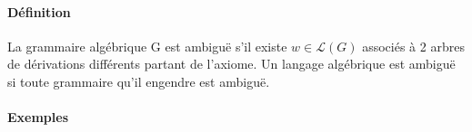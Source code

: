 

\paragraph{Définition} %
\label{par:d_finition}

La grammaire algébrique G est ambiguë s'il existe $w \in \mathcal{L}(G)$ associés à 2 arbres de dérivations différents partant de l'axiome. Un langage algébrique est ambiguë si toute grammaire qu'il engendre est ambiguë.



\paragraph{Exemples} %
\label{par:exemples}


